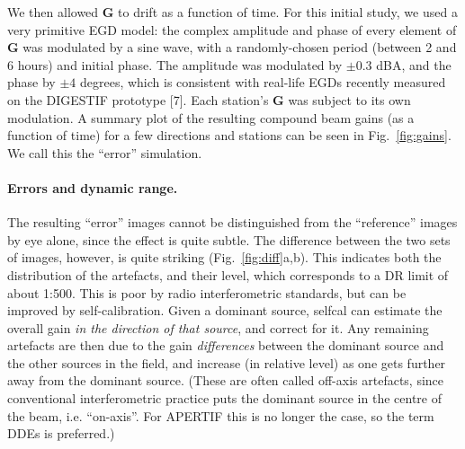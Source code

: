 \documentclass{aps2010} \special{papersize=8.5in,11in}
\begin{document}
We then allowed $\mathbf{G}$ to drift as a function of time. For this initial study, we used a very primitive EGD model: the complex amplitude and phase of every element of $\mathbf{G}$ was modulated by a  sine wave, with a randomly-chosen period (between 2 and 6 hours) and initial phase. The amplitude was modulated by $\pm0.3$ dBA, and the phase by $\pm4$ degrees, which is consistent with real-life EGDs recently measured on the DIGESTIF prototype
[7]. Each station's $\mathbf{G}$ was subject to its own modulation. A summary plot of the resulting compound beam gains (as a function of time) for a few directions and stations can be seen in Fig.~\ref{fig:gains}. We call this the ``error'' simulation.

\paragraph*{Errors and dynamic range.} The resulting ``error'' images cannot be distinguished from the ``reference'' images by eye alone, since the effect is quite subtle. The difference between the two sets of images, however, is quite striking (Fig.~\ref{fig:diff}a,b). This indicates both the distribution of the artefacts, and their level, which corresponds to a DR limit of about 1:500. This is poor by radio interferometric standards, but can be improved by self-calibration. Given a dominant source, selfcal can estimate the overall gain \emph{in the direction of that source}, and correct for it. Any remaining artefacts are then due to the gain \emph{differences} between the dominant source and the other sources in the field, and increase (in relative level) as one gets further away from the dominant source. (These are often called off-axis artefacts, since conventional interferometric practice puts the dominant source in the centre of the beam, i.e. ``on-axis''. For APERTIF this is no longer the case, so the term DDEs is preferred.) 
\end{document}
